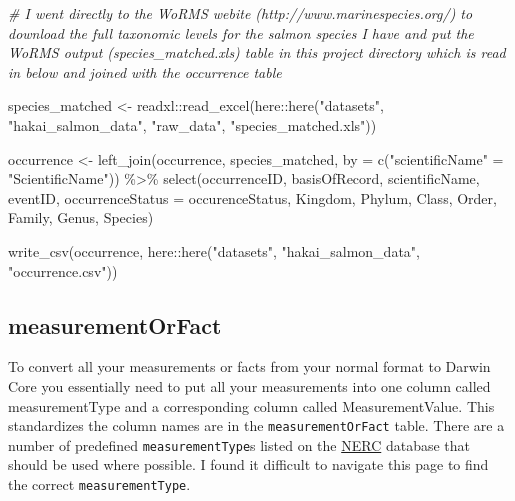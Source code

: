 \documentclass[
]{book}
\newenvironment{Shaded}{\begin{snugshade}}{\end{snugshade}}
\newcommand{\AttributeTok}[1]{\textcolor[rgb]{0.77,0.63,0.00}{#1}}
\newcommand{\CommentTok}[1]{\textcolor[rgb]{0.56,0.35,0.01}{\textit{#1}}}
\newcommand{\FunctionTok}[1]{\textcolor[rgb]{0.00,0.00,0.00}{#1}}
\newcommand{\NormalTok}[1]{#1}
\newcommand{\OtherTok}[1]{\textcolor[rgb]{0.56,0.35,0.01}{#1}}
\newcommand{\SpecialCharTok}[1]{\textcolor[rgb]{0.00,0.00,0.00}{#1}}
\newcommand{\StringTok}[1]{\textcolor[rgb]{0.31,0.60,0.02}{#1}}
\begin{document}
\begin{Shaded}
\begin{Highlighting}[]
\CommentTok{\# I went directly to the WoRMS webite (http://www.marinespecies.org/) to download the full taxonomic levels for the salmon species I have and put the WoRMS output (species\_matched.xls) table in this project directory which is read in below and joined with the occurrence table}

\NormalTok{species\_matched }\OtherTok{\textless{}{-}}\NormalTok{ readxl}\SpecialCharTok{::}\FunctionTok{read\_excel}\NormalTok{(here}\SpecialCharTok{::}\FunctionTok{here}\NormalTok{(}\StringTok{"datasets"}\NormalTok{, }\StringTok{"hakai\_salmon\_data"}\NormalTok{, }\StringTok{"raw\_data"}\NormalTok{, }\StringTok{"species\_matched.xls"}\NormalTok{))}

\NormalTok{occurrence }\OtherTok{\textless{}{-}} \FunctionTok{left\_join}\NormalTok{(occurrence, species\_matched, }\AttributeTok{by =} \FunctionTok{c}\NormalTok{(}\StringTok{"scientificName"} \OtherTok{=} \StringTok{"ScientificName"}\NormalTok{)) }\SpecialCharTok{\%\textgreater{}\%} 
  \FunctionTok{select}\NormalTok{(occurrenceID, basisOfRecord, scientificName, eventID, }\AttributeTok{occurrenceStatus =}\NormalTok{ occurenceStatus, Kingdom, Phylum, Class, Order, Family, Genus, Species)}

\FunctionTok{write\_csv}\NormalTok{(occurrence, here}\SpecialCharTok{::}\FunctionTok{here}\NormalTok{(}\StringTok{"datasets"}\NormalTok{, }\StringTok{"hakai\_salmon\_data"}\NormalTok{, }\StringTok{"occurrence.csv"}\NormalTok{))}
\end{Highlighting}
\end{Shaded}

\hypertarget{measurementorfact}{%
\subsection{measurementOrFact}\label{measurementorfact}}

To convert all your measurements or facts from your normal format to Darwin Core you essentially need to put all your measurements into one column called measurementType and a corresponding column called MeasurementValue. This standardizes the column names are in the \texttt{measurementOrFact} table. There are a number of predefined \texttt{measurementType}s listed on the \href{https://www.bodc.ac.uk/resources/vocabularies/}{NERC} database that should be used where possible. I found it difficult to navigate this page to find the correct \texttt{measurementType}.
\end{document}
